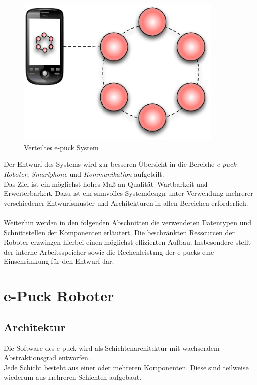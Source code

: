 \documentclass[10pt,a4paper]{article}
\let\oldsection\section
\renewcommand{\section}{\newpage \oldsection}
\begin{document}
		\begin{figure}[h]
			\centering
			\includegraphics[width=10cm]{images/system.eps}
  			\caption{Verteiltes e-puck System}
  		\end{figure}
  		
		Der Entwurf des Systems wird zur besseren Übersicht in die Bereiche \textit{e-puck Roboter}, \textit{Smartphone} und
		\textit{Kommunikation} aufgeteilt. \\
		Das Ziel ist ein möglichst hohes Maß an	Qualität, Wartbarkeit und Erweiterbarkeit. Dazu ist ein sinnvolles Systemdesign unter
		Verwendung mehrerer verschiedener Entwurfsmuster und Architekturen in allen Bereichen erforderlich. \\ \\
		Weiterhin werden in den folgenden Abschnitten die verwendeten Datentypen und Schnittstellen der Komponenten erläutert. Die beschränkten
		Ressourcen der Roboter erzwingen hierbei einen möglichst effizienten Aufbau. Insbesondere stellt der interne
		Arbeitsspeicher sowie die Rechenleistung der e-pucks eine Einschränkung für den Entwurf dar.
				
	\section{e-Puck Roboter}
  				
		\subsection{Architektur}
		Die Software des e-puck wird als Schichtenarchitektur mit wachsendem Abstraktionsgrad entworfen. \\
		Jede Schicht besteht aus einer oder mehreren Komponenten. Diese sind teilweise wiederum aus mehreren
		Schichten aufgebaut. \\
		
\end{document}
